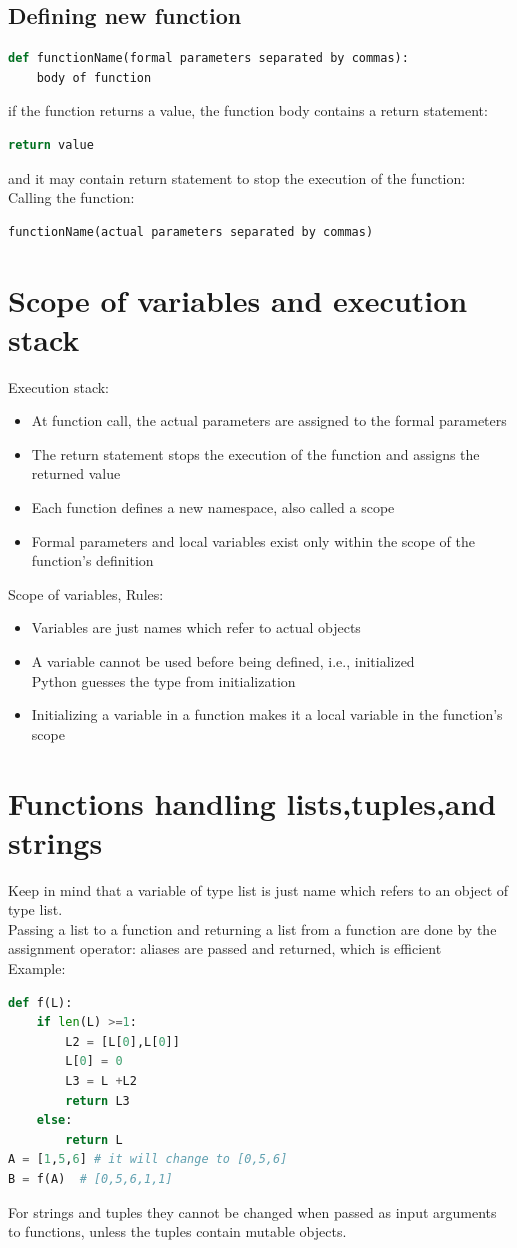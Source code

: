 \documentclass[12pt,oneside]{book}
\begin{document}
\subsection{Defining new function}
{\small\begin{lstlisting}[language=python]
def functionName(formal parameters separated by commas):
	body of function
\end{lstlisting}}
if the function returns a value, the function body contains a return statement:
{\small\begin{lstlisting}[language=python]
return value
\end{lstlisting}}
and it may contain return statement to stop the execution of the function:
Calling the function:
{\small\begin{lstlisting}[language=python]
functionName(actual parameters separated by commas)
\end{lstlisting}}
\section{Scope of variables and execution stack}
Execution stack:
\begin{itemize}
	\item At function call, the actual parameters are assigned to the formal parameters
	\item The return statement stops the execution of the function and assigns the returned value
	\item Each function defines a new namespace, also called a scope
	\item Formal parameters and local variables exist only within the scope of the function’s definition
\end{itemize}
Scope of variables, Rules:
\begin{itemize}
	\item Variables are just names which refer to actual objects
	\item A variable cannot be used before being defined, i.e., initialized\\
	      Python guesses the type from initialization
	\item Initializing a variable in a function makes it a local variable in the function’s scope
\end{itemize}
\section{Functions handling lists,tuples,and strings}
Keep in mind that a variable of type list is just name which refers to an object of type list.\\
Passing a list to a function and returning a list from a function are done by the assignment operator: aliases are passed and returned, which is efficient\\
Example:
{\small\begin{lstlisting}[language=python]
def f(L):
	if len(L) >=1:
		L2 = [L[0],L[0]]
		L[0] = 0 
		L3 = L +L2 
		return L3 
	else: 
		return L 
A = [1,5,6] # it will change to [0,5,6]
B = f(A)  # [0,5,6,1,1]
\end{lstlisting}}
For strings and tuples they cannot be changed when passed as input arguments to functions, unless the tuples contain mutable objects.
\end{document}
